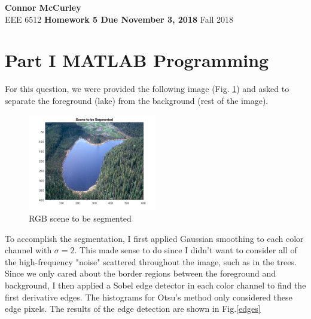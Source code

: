 \documentclass{article}[12 pt]
\begin{document}
	
\begin{center}
	\textbf{\Large Connor McCurley} \\
	EEE 6512 \qquad \textbf{\large Homework 5 Due November 3, 2018} \qquad Fall 2018 
\end{center}

\section*{Part I MATLAB Programming}

For this question, we were provided the following image (Fig. \ref{scene}) and asked to separate the foreground (lake) from the background (rest of the image). 
\begin{center}
	\begin{figure}[H]
		\centering
		\includegraphics[width = 0.5\textwidth]{Images/scene.png}
		\caption{RGB scene to be segmented}
		\label{scene}
	\end{figure}
\end{center}

\noindent
To accomplish the segmentation, I first applied Gaussian smoothing to each color channel with $\sigma=2$.  This made sense to do since I didn't want to consider all of the high-frequency "noise" scattered throughout the image, such as in the trees.  Since we only cared about the border regions between the foreground and background, I then applied a Sobel edge detector in each color channel to find the first derivative edges.  The histograms for Otsu's method only considered these edge pixels. The results of the edge detection are shown in Fig.\ref{edges}
\end{document}
